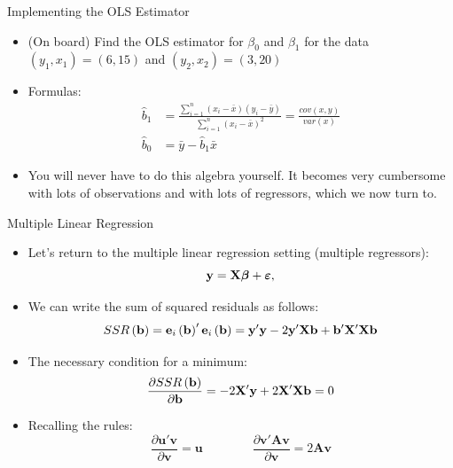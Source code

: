 \begin{frame}{Implementing the OLS Estimator}
\begin{itemize}
\item (On board) Find the OLS estimator for $\beta_0$ and $\beta_1$ for the data $(y_1,x_1)=(6,15)$ and $(y_2,x_2)=(3,20)$
\medskip

\item Formulas:
\begin{align*}
\hat{b}_1 &=\frac{\sum\limits_{i=1}^n(x_i-\bar{x})(y_i-\bar{y})}{\sum\limits_{i=1}^n(x_i-\bar{x})^2}=\frac{cov\left(x,y\right)}{var\left(x\right)} \\
\hat{b}_0 & = \bar{y} - \hat{b}_1 \bar{x}
\end{align*}

\item You will never have to do this algebra yourself. It becomes very cumbersome with lots of observations and with lots of regressors,
which we now turn to.

\end{itemize}
\end{frame}


\begin{frame}{Multiple Linear Regression}
\begin{itemize}
	\item Let's return to the multiple linear regression setting (multiple regressors):
	\begin{equation*}
		{\bf y}= {\bf X} \boldsymbol{\beta} + \boldsymbol{\varepsilon},
	\end{equation*}

	\item We can write the sum of squared residuals as follows:\[
	SSR\left({\bf b}\right) = {\bf e}_i \left({\bf b}\right) '  {\bf e}_i \left({\bf b}\right) = {\bf y}'{\bf y} - 2{\bf y}'{\bf X}{\bf b} + {\bf b}' {\bf X}'{\bf X}{\bf b} 
\]


	\item The necessary condition for a minimum:\[
	\frac{\partial SSR\left({\bf b}\right)}{\partial {\bf b}} = - 2 {\bf X}' {\bf y} + 2 {\bf X}'{\bf X} {\bf b} = 0 
	\]

	\item Recalling the rules:\[
\frac{\partial\boldsymbol{u}'\boldsymbol{v}}{\partial\boldsymbol{v}}=\boldsymbol{u}\qquad\qquad\frac{\partial\boldsymbol{v}'\boldsymbol{A}\boldsymbol{v}}{\partial\boldsymbol{v}}=2\boldsymbol{A}\boldsymbol{v}
\]

\end{itemize}
\end{frame}


